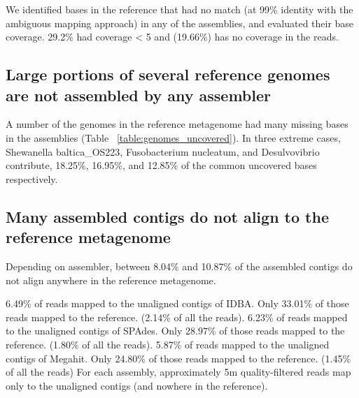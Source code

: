 \documentclass[10pt,a4paper,twocolumn]{article}
\begin{document}
We identified bases in the reference that had no match (at 99\%
identity with the ambiguous mapping approach) in any of the
assemblies, and evaluated their base coverage. 29.2\% had coverage < 5
and (19.66\%) has no coverage in the reads.



\subsection*{Large portions of several reference genomes are not assembled by any assembler}

A number of the genomes in the reference metagenome had many missing
bases in the assemblies (Table ~\ref{table:genomes_uncovered}). In
three extreme cases, Shewanella baltica\_OS223, Fusobacterium
nucleatum, and Desulvovibrio contribute, 18.25\%, 16.95\%, and 12.85\%
of the common uncovered bases respectively.

\subsection*{Many assembled contigs do not align to the reference metagenome}
Depending on assembler, between 8.04\% and 10.87\% of the assembled
contigs do not align anywhere in the reference metagenome.

6.49\% of reads mapped to the unaligned contigs of IDBA. Only 33.01\%
of those reads mapped to the reference. (2.14\% of all the reads).
6.23\% of reads mapped to the unaligned contigs of SPAdes. Only
28.97\% of those reads mapped to the reference. (1.80\% of all the
reads).  5.87\% of reads mapped to the unaligned contigs of
Megahit. Only 24.80\% of those reads mapped to the reference. (1.45\%
of all the reads)
For
each assembly, approximately 5m quality-filtered reads map only to the
unaligned contigs (and nowhere in the reference).
\end{document}
